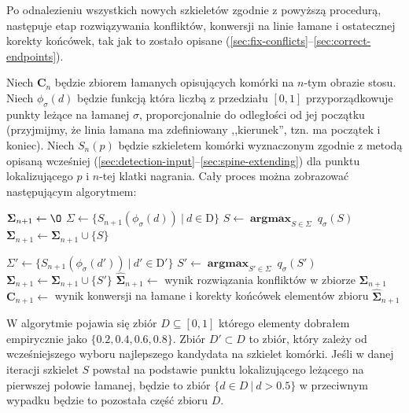 \documentclass[declaration,shortabstract,mgr]{iithesis}
\DeclareMathOperator*{\argmax}{\textbf{argmax}}
\begin{document}
Po odnalezieniu wszystkich nowych szkieletów zgodnie z powyższą procedurą, następuje etap rozwiązywania konfliktów, konwersji na linie łamane i ostatecznej korekty końcówek, tak jak to zostało opisane (\ref{sec:fix-conflicts}--\ref{sec:correct-endpoints}).


Niech $\mathbf{C}_n$ będzie zbiorem łamanych opisujących komórki na $n$-tym obrazie stosu.
Niech $\phi_\sigma(d)$ będzie funkcją która liczbą z przedziału $[0, 1]$ przyporządkowuje punkty leżące na łamanej $\sigma$, proporcjonalnie do odległości od jej początku (przyjmijmy, że linia łamana ma zdefiniowany ,,kierunek'', tzn. ma początek i koniec). Niech $S_n(p)$ będzie szkieletem komórki wyznaczonym zgodnie z metodą opisaną wcześniej (\ref{sec:detection-input}--\ref{sec:spine-extending}) dla punktu lokalizującego $p$ i $n$-tej klatki nagrania.
Cały proces można zobrazować następującym algorytmem:

\par\medskip
\begin{algorithmic}

  \STATE $\mathbf{\Sigma}_{n+1} \gets \O$
    \STATE $\Sigma \gets \{ S_{n+1}(\phi_\sigma(d)) \ | \ d \in \text{D} \}$
    \STATE $S \gets \argmax_{S \in \Sigma} \ q_\sigma(S)$
    \STATE $\mathbf{\Sigma}_{n+1} \gets \mathbf{\Sigma}_{n+1} \cup \{ S \}$

      \STATE $\Sigma' \gets \{ S_{n+1}(\phi_\sigma(d')) \ | \ d' \in \text{D}' \}$
      \STATE $S' \gets \argmax_{S' \in \Sigma} \ q_\sigma(S')$
      \STATE $\mathbf{\Sigma}_{n+1} \gets \mathbf{\Sigma}_{n+1} \cup \{ S' \}$
    \ENDIF
  \ENDFOR
  \STATE $\mathbf{\hat{\Sigma}}_{n+1} \gets$ wynik rozwiązania konfliktów w zbiorze $\mathbf{\Sigma}_{n+1}$
  \STATE $\mathbf{C}_{n+1} \gets$ wynik konwersji na łamane i korekty końcówek elementów zbioru $\mathbf{\hat{\Sigma}}_{n+1}$
\ENDFOR

\end{algorithmic}

\noindent
W algorytmie pojawia się zbiór $D \subseteq [0, 1]$ którego elementy dobrałem empirycznie jako $\{ 0.2, 0.4, 0.6, 0.8 \}$.
Zbiór $D' \subset D$ to zbiór, który zależy od wcześniejszego wyboru najlepszego kandydata na szkielet komórki.
Jeśli w danej iteracji szkielet $S$ powstał na podstawie punktu lokalizującego leżącego na pierwszej połowie łamanej, będzie to zbiór $\{ d \in D \ | \ d > 0.5 \}$ w przeciwnym wypadku będzie to pozostała część zbioru $D$.
\end{document}
